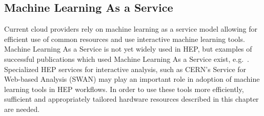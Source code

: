 

\subsection{Machine Learning As a Service}
Current cloud providers rely on machine learning as a service model allowing for efficient use of common resources and use interactive machine learning tools. Machine Learning As a Service is not yet widely used in HEP, but examples of successful publications which used Machine Learning As a Service exist, e.g.~\cite{Aaij:2014azz}. Specialized HEP services for interactive analysis, such as CERN's Service for Web-based Analysis (SWAN) may play an important role in adoption of machine learning tools in HEP workflows. In order to use these tools more efficiently, sufficient and appropriately tailored hardware resources  described in this chapter are needed.




